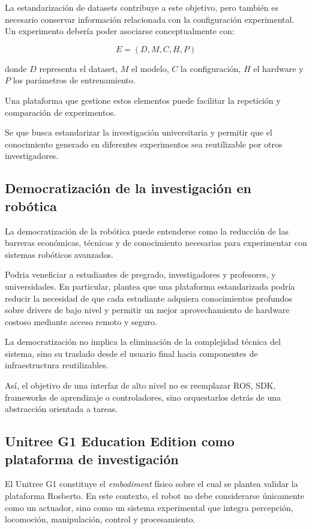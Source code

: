\documentclass[stu,12pt,floatsintext]{apa7}
\begin{document}
La estandarización de datasets contribuye a este objetivo, pero también es necesario conservar información relacionada con la configuración experimental. Un experimento debería poder asociarse conceptualmente con:

\begin{equation}
E = (D,M,C,H,P)
\end{equation}

donde $D$ representa el dataset, $M$ el modelo, $C$ la configuración, $H$ el hardware y $P$ los parámetros de entrenamiento.

Una plataforma que gestione estos elementos puede facilitar la repetición y comparación de experimentos.

Se que busca estandarizar la investigación universitaria y permitir que el conocimiento generado en diferentes experimentos sea reutilizable por otros investigadores.

\subsection{Democratización de la investigación en robótica}

La democratización de la robótica puede entenderse como la reducción de las barreras económicas, técnicas y de conocimiento necesarias para experimentar con sistemas robóticos avanzados.

Podria veneficiar a estudiantes de pregrado, investigadores y profesores, y universidades. En particular, plantea que una plataforma estandarizada podría reducir la necesidad de que cada estudiante adquiera conocimientos profundos sobre drivers de bajo nivel y permitir un mejor aprovechamiento de hardware costoso mediante acceso remoto y seguro.

La democratización no implica la eliminación de la complejidad técnica del sistema, sino su traslado desde el usuario final hacia componentes de infraestructura reutilizables.

Así, el objetivo de una interfaz de alto nivel no es reemplazar ROS, SDK, frameworks de aprendizaje o controladores, sino orquestarlos detrás de una abstracción orientada a tareas.

\subsection{Unitree G1 Education Edition como plataforma de investigación}

El Unitree G1 constituye el \textit{embodiment} físico sobre el cual se plantea validar la plataforma Rosberto. En este contexto, el robot no debe considerarse únicamente como un actuador, sino como un sistema experimental que integra percepción, locomoción, manipulación, control y procesamiento.
\end{document}
